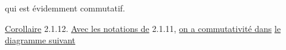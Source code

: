 \begin{center}
\end{center}
qui est évidemment commutatif.

\underline{Corollaire} 2.1.12. \underline{Avec les notations de} 2.1.11, \underline{on a commutativité dans} \underline{le diagramme suivant}

